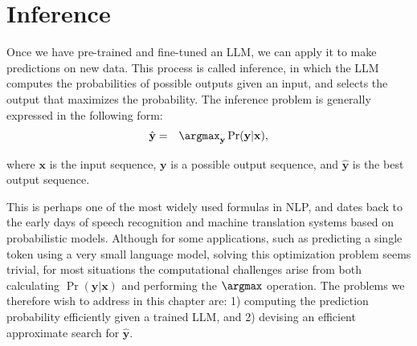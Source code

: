 
%




\chapter{Inference}

\thispagestyle{chapterurl} %

Once we have pre-trained and fine-tuned an LLM, we can apply it to make predictions on new data. This process is called inference, in which the LLM computes the probabilities of possible outputs given an input, and selects the output that maximizes the probability. The inference problem is generally expressed in the following form:
\begin{eqnarray}
\hat{\mathbf{y}} & = & \argmax_{\mathbf{y}} \Pr(\mathbf{y}|\mathbf{x}), \label{eq:llm-argmax-base}
\end{eqnarray}

\noindent where $\mathbf{x}$ is the input sequence, $\mathbf{y}$ is a possible output sequence, and $\hat{\mathbf{y}}$ is the best output sequence.

This is perhaps one of the most widely used formulas in NLP, and dates back to the early days of speech recognition and machine translation systems based on probabilistic models. Although for some applications, such as predicting a single token using a very small language model, solving this optimization problem seems trivial, for most situations the computational challenges arise from both calculating $\Pr(\mathbf{y}|\mathbf{x})$ and performing the $\argmax$ operation. The problems we therefore wish to address in this chapter are: 1) computing the prediction probability efficiently given a trained LLM, and 2) devising an efficient approximate search for $\hat{\mathbf{y}}$.

